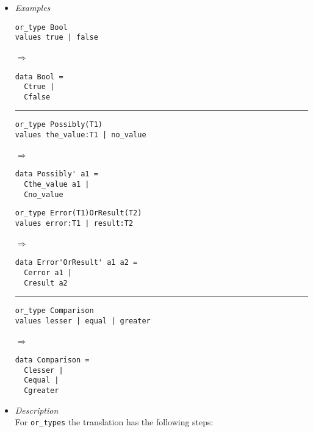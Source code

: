 \documentclass[diploma]{softlab-thesis}
\def\lra{$\Longrightarrow$\ }
\begin{document}
\begin{itemize}

\item
\textit{Examples}

\begin{minipage}[t][9cm][t]{\linewidth}
\begin{minipage}{0.35\linewidth}
\begin{verbatim}
or_type Bool
values true | false
\end{verbatim}
\lra
\begin{verbatim}
data Bool =
  Ctrue |
  Cfalse
\end{verbatim}

\rule{\linewidth}{0.1pt}

\begin{verbatim}
or_type Possibly(T1)
values the_value:T1 | no_value
\end{verbatim}
\lra
\begin{verbatim}
data Possibly' a1 =
  Cthe_value a1 |
  Cno_value
\end{verbatim}

\end{minipage}
\hfill\vline\hfill
\begin{minipage}{0.45\linewidth}

\begin{verbatim}
or_type Error(T1)OrResult(T2)
values error:T1 | result:T2
\end{verbatim}
\lra
\begin{verbatim}
data Error'OrResult' a1 a2 =
  Cerror a1 |
  Cresult a2
\end{verbatim}

\rule{\linewidth}{0.1pt}

\begin{verbatim}
or_type Comparison
values lesser | equal | greater
\end{verbatim}
\lra
\begin{verbatim}
data Comparison =
  Clesser |
  Cequal |
  Cgreater
\end{verbatim}

\end{minipage}

\end{minipage}

\item
\textit{Description}\\

For \verb|or_types| the translation has the following steps:

\begin{enumerate}


\end{enumerate}
\end{itemize}
\end{document}
